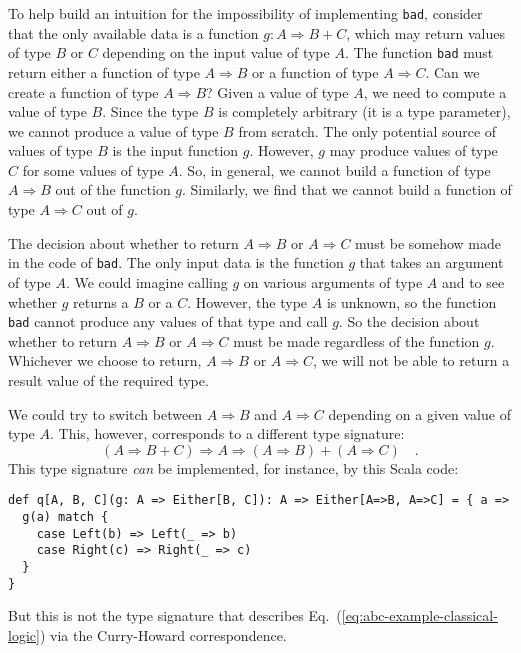To help build an intuition for the impossibility of implementing \lstinline!bad!,
consider that the only available data is a function $g:A\Rightarrow B+C$,
which may return values of type $B$ or $C$ depending on the input
value of type $A$. The function \lstinline!bad!
must return either a function of type $A\Rightarrow B$ or a function
of type $A\Rightarrow C$. Can we create a function of type $A\Rightarrow B$?
Given a value of type $A$, we need to compute a value of type $B$.
Since the type $B$ is completely arbitrary (it is a type parameter),
we cannot produce a value of type $B$ from scratch. The only potential
source of values of type $B$ is the input function $g$. However,
$g$ may produce values of type $C$ for some values of type $A$.
So, in general, we cannot build a function of type $A\Rightarrow B$
out of the function $g$. Similarly, we find that we cannot build
a function of type $A\Rightarrow C$ out of $g$. 

The decision about whether to return $A\Rightarrow B$ or $A\Rightarrow C$
must be somehow made in the code of \lstinline!bad!.
The only input data is the function $g$ that takes an argument of
type $A$. We could imagine calling $g$ on various arguments of type
$A$ and to see whether $g$ returns a $B$ or a $C$. However, the
type $A$ is unknown, so the function \lstinline!bad!
cannot produce any values of that type and call $g$. So the decision
about whether to return $A\Rightarrow B$ or $A\Rightarrow C$ must
be made regardless of the function $g$. Whichever we choose to return,
$A\Rightarrow B$ or $A\Rightarrow C$, we will not be able to return
a result value of the required type.

We could try to switch between $A\Rightarrow B$ and $A\Rightarrow C$
depending on a given value of type $A$. This, however, corresponds
to a different type signature: 
\[
\left(A\Rightarrow B+C\right)\Rightarrow A\Rightarrow\left(A\Rightarrow B\right)+\left(A\Rightarrow C\right)\quad.
\]
This type signature \emph{can} be implemented, for instance, by this
Scala code:
\begin{lstlisting}
def q[A, B, C](g: A => Either[B, C]): A => Either[A=>B, A=>C] = { a =>
  g(a) match {
    case Left(b) => Left(_ => b)
    case Right(c) => Right(_ => c)
  }
}
\end{lstlisting}
But this is not the type signature that describes Eq.~(\ref{eq:abc-example-classical-logic})
via the Curry-Howard correspondence.

